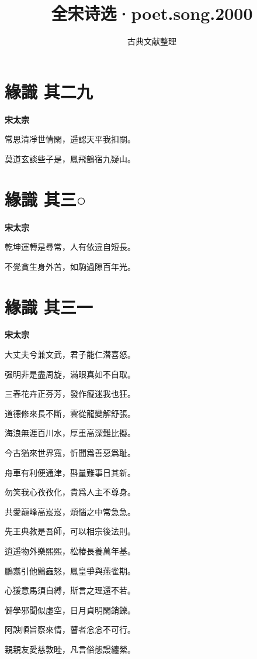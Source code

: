 \documentclass[12pt,a4paper]{ctexbook}
\title{全宋诗选·poet.song.2000}
\author{古典文献整理}
\date{}
\begin{document}
\maketitle
\tableofcontents
\newpage
\section{緣識  其二九}
\textbf{宋太宗}\par\vspace{0.5em}
常思清凈世情閑，遥認天平我扣關。\par
莫道玄談些子是，鳳飛鶴宿九疑山。\par

\section{緣識  其三○}
\textbf{宋太宗}\par\vspace{0.5em}
乾坤運轉是尋常，人有依違自短長。\par
不覺貪生身外苦，如駒過隙百年光。\par

\section{緣識  其三一}
\textbf{宋太宗}\par\vspace{0.5em}
大丈夫兮兼文武，君子能仁潜喜怒。\par
强明非是盡周旋，滿眼真如不自取。\par
三春花卉正芬芳，發作癡迷我也狂。\par
道德修來長不斷，雲從龍變解舒張。\par
海浪無涯百川水，厚重高深難比擬。\par
今古猶來世界寬，忻聞爲善惡爲耻。\par
舟車有利便通津，斟量難事日其新。\par
勿笑我心孜孜化，貴爲人主不尊身。\par
共愛巔峰高岌岌，煩惱之中常急急。\par
先王典教是吾師，可以相宗後法則。\par
逍遥物外樂熙熙，松椿長養萬年基。\par
鵬翥引他鷦蝱怒，鳳皇爭與燕雀期。\par
心猨意馬須自縛，斯言之理還不若。\par
僻學邪聞似虛空，日月貞明閑銷鑠。\par
阿諛順旨察來情，瞽者忩忩不可行。\par
親親友愛慈敦睦，凡言俗態謾纏縈。\par
\end{document}
